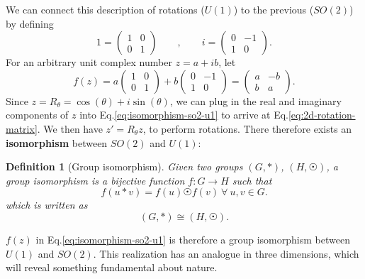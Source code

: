 \documentclass[11pt]{article}
\numberwithin{equation}{section}
\newtheorem{defn}{Definition}[section]
\begin{document}
We can connect this description of rotations ($U(1)$) to the previous ($SO(2)$) by defining 
\begin{equation}
1 = \begin{pmatrix}
1 & 0\\
0 & 1
\end{pmatrix}\qquad,\qquad
i = \begin{pmatrix}
0 & -1\\
1 & 0
\end{pmatrix}. \label{eq:map-complex-rot-to-2d-vectors}
\end{equation}
For an arbitrary unit complex number $z = a + ib$, let
\begin{equation}
f(z) = a \begin{pmatrix}
1 & 0\\
0 & 1
\end{pmatrix} + b \begin{pmatrix}
0 & -1\\
1 & 0
\end{pmatrix} = \begin{pmatrix}
a & -b\\
b & a
\end{pmatrix}. \label{eq:isomorphism-so2-u1}
\end{equation}
Since $z = R_\theta = \cos(\theta) + i \sin(\theta)$, we can plug in the real and imaginary components of $z$ into Eq.\eqref{eq:isomorphism-so2-u1} to arrive at Eq.\eqref{eq:2d-rotation-matrix}. We then have $z' = R_\theta z$, to perform rotations. There therefore exists an \textbf{isomorphism} between $SO(2)$ and $U(1)$:
\begin{defn}[Group isomorphism]
Given two groups $(G, *)$, $(H, \astrosun)$, a group isomorphism is a bijective function $f: G \rightarrow H$ such that
\begin{equation}
f(u * v) = f(u) \astrosun f(v) \ \forall\ u, v \in G.
\end{equation}
which is written as
\begin{equation}
(G, *) \cong (H, \astrosun).
\end{equation}
\end{defn}
\noindent $f(z)$ in Eq.\eqref{eq:isomorphism-so2-u1} is therefore a group isomorphism between $U(1)$ and $SO(2)$. This realization has an analogue in three dimensions, which will reveal something fundamental about nature.
\end{document}
